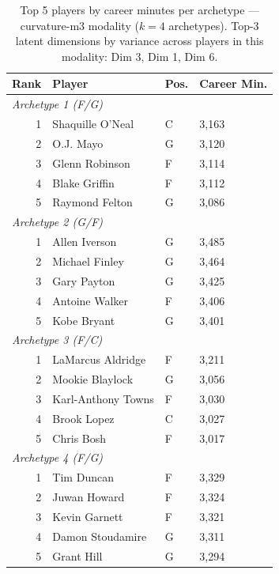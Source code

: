 \begin{table}[htbp]
  \centering\small
  \begin{tabular}{rlll}
    \toprule
    Rank & Player & Pos. & Career Min. \\
    \midrule
    \multicolumn{4}{l}{\textit{Archetype 1 (F/G)}} \\
    \midrule
    1 & Shaquille O'Neal & C & 3,163 \\
    2 & O.J. Mayo & G & 3,120 \\
    3 & Glenn Robinson & F & 3,114 \\
    4 & Blake Griffin & F & 3,112 \\
    5 & Raymond Felton & G & 3,086 \\
    \midrule[0.4pt]
    \multicolumn{4}{l}{\textit{Archetype 2 (G/F)}} \\
    \midrule
    1 & Allen Iverson & G & 3,485 \\
    2 & Michael Finley & G & 3,464 \\
    3 & Gary Payton & G & 3,425 \\
    4 & Antoine Walker & F & 3,406 \\
    5 & Kobe Bryant & G & 3,401 \\
    \midrule[0.4pt]
    \multicolumn{4}{l}{\textit{Archetype 3 (F/C)}} \\
    \midrule
    1 & LaMarcus Aldridge & F & 3,211 \\
    2 & Mookie Blaylock & G & 3,056 \\
    3 & Karl-Anthony Towns & F & 3,030 \\
    4 & Brook Lopez & C & 3,027 \\
    5 & Chris Bosh & F & 3,017 \\
    \midrule[0.4pt]
    \multicolumn{4}{l}{\textit{Archetype 4 (F/G)}} \\
    \midrule
    1 & Tim Duncan & F & 3,329 \\
    2 & Juwan Howard & F & 3,324 \\
    3 & Kevin Garnett & F & 3,321 \\
    4 & Damon Stoudamire & G & 3,311 \\
    5 & Grant Hill & G & 3,294 \\
    \bottomrule
  \end{tabular}
  \caption{Top 5 players by career minutes per archetype --- curvature-m3 modality ($k=4$ archetypes). Top-3 latent dimensions by variance across players in this modality: Dim 3, Dim 1, Dim 6.}
  \label{tab:arch_reps_curvature_m3}
\end{table}

